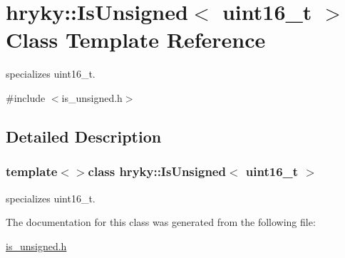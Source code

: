\hypertarget{classhryky_1_1_is_unsigned_3_01uint16__t_01_4}{\section{hryky\-:\-:Is\-Unsigned$<$ uint16\-\_\-t $>$ Class Template Reference}
\label{classhryky_1_1_is_unsigned_3_01uint16__t_01_4}
}


specializes uint16\-\_\-t.  




{\ttfamily \#include $<$is\-\_\-unsigned.\-h$>$}



\subsection{Detailed Description}
\subsubsection*{template$<$$>$class hryky\-::\-Is\-Unsigned$<$ uint16\-\_\-t $>$}

specializes uint16\-\_\-t. 

The documentation for this class was generated from the following file\-:\begin{DoxyCompactItemize}
\item 
\hyperlink{is__unsigned_8h}{is\-\_\-unsigned.\-h}\end{DoxyCompactItemize}
